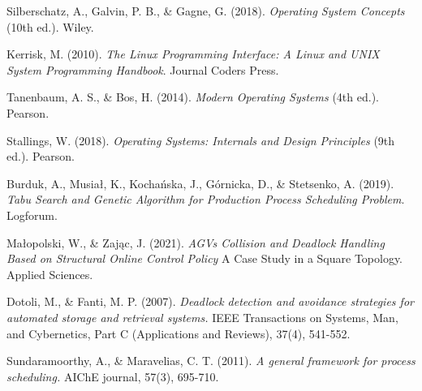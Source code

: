\documentclass[12pt]{article}
\begin{document}
\vspace{2cm}
\begin{thebibliography}{9}

    Silberschatz, A., Galvin, P. B., \& Gagne, G. (2018). \textit{Operating System Concepts} (10th ed.). Wiley.
    
    Kerrisk, M. (2010). \textit{The Linux Programming Interface: A Linux and UNIX System Programming Handbook}. Journal Coders Press.
    
    Tanenbaum, A. S., \& Bos, H. (2014). \textit{Modern Operating Systems} (4th ed.). Pearson.
    
    Stallings, W. (2018). \textit{Operating Systems: Internals and Design Principles} (9th ed.). Pearson.

    Burduk, A., Musiał, K., Kochańska, J., Górnicka, D., \& Stetsenko, A. (2019). \textit{Tabu Search and Genetic Algorithm for Production Process Scheduling Problem}. Logforum.

    Małopolski, W., \& Zając, J. (2021). \textit{AGVs Collision and Deadlock Handling Based on Structural Online Control Policy} A Case Study in a Square Topology. Applied Sciences.

    Dotoli, M., \& Fanti, M. P. (2007). \textit{Deadlock detection and avoidance strategies for automated storage and retrieval systems.} IEEE Transactions on Systems, Man, and Cybernetics, Part C (Applications and Reviews), 37(4), 541-552.

    Sundaramoorthy, A., \& Maravelias, C. T. (2011). \textit{A general framework for process scheduling.} AIChE journal, 57(3), 695-710.
    
    \end{thebibliography}
\end{document}
